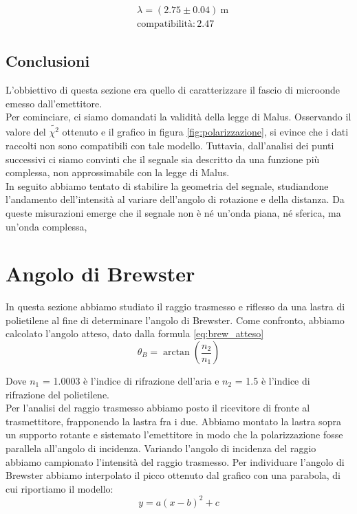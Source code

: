 \documentclass[letterpaper,12pt]{article}
\begin{document}
\begin{align*}
	 & \lambda = (2.75 \pm 0.04)\ \text{m} \\
	 & \text{compatibilità}: 2.47
\end{align*}

\subsection{Conclusioni}

L'obbiettivo di questa sezione era quello di caratterizzare il fascio di microonde emesso dall'emettitore.\\
Per cominciare, ci siamo domandati la validità della legge di Malus. Osservando il valore del $\tilde{\chi^2}$
ottenuto e il grafico in figura \ref{fig:polarizzazione}, si evince che i dati raccolti non sono compatibili con tale modello.
Tuttavia, dall'analisi dei punti successivi ci siamo convinti che il segnale sia descritto da una funzione più complessa,
non approssimabile con la legge di Malus.\\
In seguito abbiamo tentato di stabilire la geometria del segnale, studiandone l'andamento dell'intensità al variare
dell'angolo di rotazione e della distanza. Da queste misurazioni emerge che il segnale non è né un'onda piana, né sferica,
ma un'onda complessa, 


\section{Angolo di Brewster}
In questa sezione abbiamo studiato il raggio trasmesso e riflesso da una lastra di polietilene al fine di 
determinare l'angolo di Brewster. Come confronto, abbiamo calcolato l'angolo atteso, 
dato dalla formula \ref{eq:brew_atteso}
\begin{equation}
	\theta_B = \arctan\left(\frac{n_2}{n_1}\right)
	\label{eq:brew_atteso}
\end{equation}

Dove $n_1$ = 1.0003 è l'indice di rifrazione dell'aria e $n_2$ = 1.5 è l'indice di rifrazione del polietilene.\\

Per l'analisi del raggio trasmesso abbiamo posto il ricevitore di fronte al trasmettitore, frapponendo la lastra
fra i due. Abbiamo montato la lastra sopra un supporto rotante e 
sistemato l'emettitore in modo che la polarizzazione fosse parallela all'angolo di incidenza. 
Variando l'angolo di incidenza del raggio abbiamo campionato l'intensità del raggio trasmesso.
Per individuare l'angolo di Brewster abbiamo interpolato il picco ottenuto dal grafico con una parabola, di
cui riportiamo il modello:
\begin{equation}
	y = a(x-b)^2 + c
	\label{eq:parabola}
\end{equation}
\\
\end{document}
